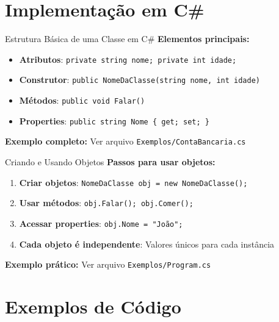 \documentclass[aspectratio=169]{beamer}
\begin{document}
\section{Implementação em C\#}

\begin{frame}{Estrutura Básica de uma Classe em C\#}
\textbf{Elementos principais:}
\begin{itemize}
\item \textbf{Atributos}: \texttt{private string nome; private int idade;}
\item \textbf{Construtor}: \texttt{public NomeDaClasse(string nome, int idade)}
\item \textbf{Métodos}: \texttt{public void Falar()}
\item \textbf{Properties}: \texttt{public string Nome \{ get; set; \}}
\end{itemize}

\vspace{0.3cm}
\textbf{Exemplo completo:} Ver arquivo \texttt{Exemplos/ContaBancaria.cs}
\end{frame}

\begin{frame}{Criando e Usando Objetos}
\textbf{Passos para usar objetos:}
\begin{enumerate}
\item \textbf{Criar objetos}: \texttt{NomeDaClasse obj = new NomeDaClasse();}
\item \textbf{Usar métodos}: \texttt{obj.Falar(); obj.Comer();}
\item \textbf{Acessar properties}: \texttt{obj.Nome = "João";}
\item \textbf{Cada objeto é independente}: Valores únicos para cada instância
\end{enumerate}

\vspace{0.3cm}
\textbf{Exemplo prático:} Ver arquivo \texttt{Exemplos/Program.cs}
\end{frame}

\section{Exemplos de Código}
\end{document}
